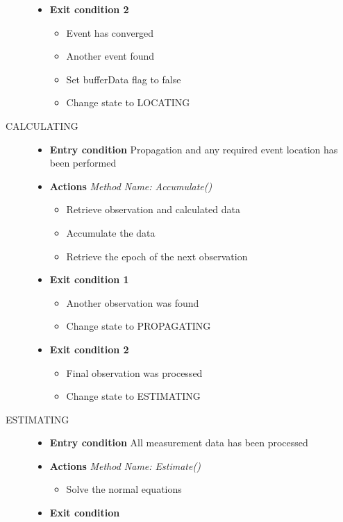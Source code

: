 \begin{description}
\begin{itemize}
\begin{itemize}
\end{itemize}
\item \textbf{Exit condition 2}
\begin{itemize}
\item Event has converged
\item Another event found
\item Set bufferData flag to false
\item Change state to LOCATING
\end{itemize}
\end{itemize}
\item[CALCULATING]\hspace{1pt}
\begin{itemize}
\item \textbf{Entry condition} Propagation and any required event location has been performed
\item \textbf{Actions} \textit{Method Name:  Accumulate()}
\begin{itemize}
\item Retrieve observation and calculated data
\item Accumulate the data
\item Retrieve the epoch of the next observation
\end{itemize}
\item \textbf{Exit condition 1}
\begin{itemize}
\item Another observation was found
\item Change state to PROPAGATING
\end{itemize}
\item \textbf{Exit condition 2}
\begin{itemize}
\item Final observation was processed
\item Change state to ESTIMATING
\end{itemize}
\end{itemize}
\item[ESTIMATING]\hspace{1pt}
\begin{itemize}
\item \textbf{Entry condition} All measurement data has been processed
\item \textbf{Actions} \textit{Method Name:  Estimate()}
\begin{itemize}
\item Solve the normal equations
\end{itemize}
\item \textbf{Exit condition}

\end{itemize}
\end{description}
